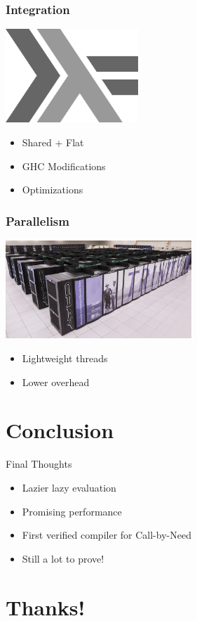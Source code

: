 \documentclass[14pt,mathserif]{beamer}
\begin{document}
\begin{frame}
\frametitle{Integration}
\centering
\includegraphics[width=5cm]{haskell}
\begin{itemize}
\item Shared + Flat
\item GHC Modifications
\item Optimizations 
\end{itemize}
\end{frame}

\begin{frame}
\frametitle{Parallelism}
\includegraphics[width=7cm]{trinity}
\centering
\begin{itemize}
\item Lightweight threads
\item Lower overhead
\end{itemize}
\end{frame}

\section{Conclusion}
\begin{frame}{Final Thoughts}
\begin{itemize}
\item Lazier lazy evaluation
\item Promising performance 
\item First verified compiler for Call-by-Need
\item Still a lot to prove!
\end{itemize}
\end{frame}

\section{Thanks!}

%
%
\end{document}
